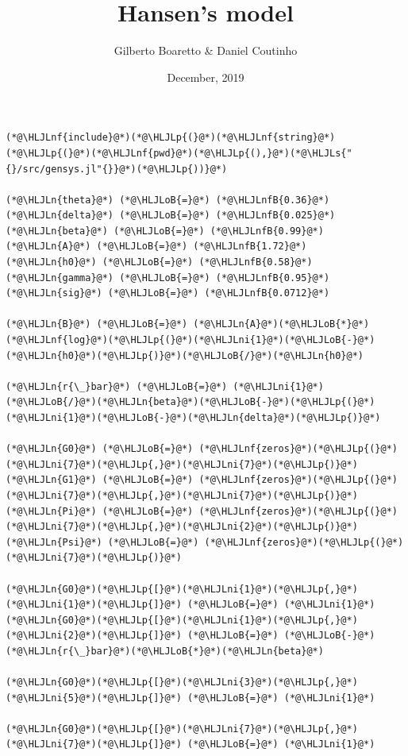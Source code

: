 \documentclass[12pt,a4paper]{article}
\title{ Hansen's model }
\author{ Gilberto Boaretto & Daniel Coutinho }
\date{ December, 2019 }
\newcommand{\HLJLn}[1]{#1}
\newcommand{\HLJLnf}[1]{\textcolor[RGB]{66,102,213}{#1}}
\newcommand{\HLJLs}[1]{\textcolor[RGB]{201,61,57}{#1}}
\newcommand{\HLJLnfB}[1]{\textcolor[RGB]{59,151,46}{#1}}
\newcommand{\HLJLni}[1]{\textcolor[RGB]{59,151,46}{#1}}
\newcommand{\HLJLoB}[1]{\textcolor[RGB]{102,102,102}{\textbf{#1}}}
\newcommand{\HLJLp}[1]{#1}
\begin{document}
\maketitle


\begin{lstlisting}
(*@\HLJLnf{include}@*)(*@\HLJLp{(}@*)(*@\HLJLnf{string}@*)(*@\HLJLp{(}@*)(*@\HLJLnf{pwd}@*)(*@\HLJLp{(),}@*)(*@\HLJLs{"{}/src/gensys.jl"{}}@*)(*@\HLJLp{))}@*)

(*@\HLJLn{theta}@*) (*@\HLJLoB{=}@*) (*@\HLJLnfB{0.36}@*)
(*@\HLJLn{delta}@*) (*@\HLJLoB{=}@*) (*@\HLJLnfB{0.025}@*)
(*@\HLJLn{beta}@*) (*@\HLJLoB{=}@*) (*@\HLJLnfB{0.99}@*)
(*@\HLJLn{A}@*) (*@\HLJLoB{=}@*) (*@\HLJLnfB{1.72}@*)
(*@\HLJLn{h0}@*) (*@\HLJLoB{=}@*) (*@\HLJLnfB{0.58}@*)
(*@\HLJLn{gamma}@*) (*@\HLJLoB{=}@*) (*@\HLJLnfB{0.95}@*)
(*@\HLJLn{sig}@*) (*@\HLJLoB{=}@*) (*@\HLJLnfB{0.0712}@*)

(*@\HLJLn{B}@*) (*@\HLJLoB{=}@*) (*@\HLJLn{A}@*)(*@\HLJLoB{*}@*)(*@\HLJLnf{log}@*)(*@\HLJLp{(}@*)(*@\HLJLni{1}@*)(*@\HLJLoB{-}@*)(*@\HLJLn{h0}@*)(*@\HLJLp{)}@*)(*@\HLJLoB{/}@*)(*@\HLJLn{h0}@*)

(*@\HLJLn{r{\_}bar}@*) (*@\HLJLoB{=}@*) (*@\HLJLni{1}@*)(*@\HLJLoB{/}@*)(*@\HLJLn{beta}@*)(*@\HLJLoB{-}@*)(*@\HLJLp{(}@*)(*@\HLJLni{1}@*)(*@\HLJLoB{-}@*)(*@\HLJLn{delta}@*)(*@\HLJLp{)}@*)

(*@\HLJLn{G0}@*) (*@\HLJLoB{=}@*) (*@\HLJLnf{zeros}@*)(*@\HLJLp{(}@*)(*@\HLJLni{7}@*)(*@\HLJLp{,}@*)(*@\HLJLni{7}@*)(*@\HLJLp{)}@*)
(*@\HLJLn{G1}@*) (*@\HLJLoB{=}@*) (*@\HLJLnf{zeros}@*)(*@\HLJLp{(}@*)(*@\HLJLni{7}@*)(*@\HLJLp{,}@*)(*@\HLJLni{7}@*)(*@\HLJLp{)}@*)
(*@\HLJLn{Pi}@*) (*@\HLJLoB{=}@*) (*@\HLJLnf{zeros}@*)(*@\HLJLp{(}@*)(*@\HLJLni{7}@*)(*@\HLJLp{,}@*)(*@\HLJLni{2}@*)(*@\HLJLp{)}@*)
(*@\HLJLn{Psi}@*) (*@\HLJLoB{=}@*) (*@\HLJLnf{zeros}@*)(*@\HLJLp{(}@*)(*@\HLJLni{7}@*)(*@\HLJLp{)}@*)

(*@\HLJLn{G0}@*)(*@\HLJLp{[}@*)(*@\HLJLni{1}@*)(*@\HLJLp{,}@*)(*@\HLJLni{1}@*)(*@\HLJLp{]}@*) (*@\HLJLoB{=}@*) (*@\HLJLni{1}@*)
(*@\HLJLn{G0}@*)(*@\HLJLp{[}@*)(*@\HLJLni{1}@*)(*@\HLJLp{,}@*)(*@\HLJLni{2}@*)(*@\HLJLp{]}@*) (*@\HLJLoB{=}@*) (*@\HLJLoB{-}@*)(*@\HLJLn{r{\_}bar}@*)(*@\HLJLoB{*}@*)(*@\HLJLn{beta}@*)

(*@\HLJLn{G0}@*)(*@\HLJLp{[}@*)(*@\HLJLni{3}@*)(*@\HLJLp{,}@*)(*@\HLJLni{5}@*)(*@\HLJLp{]}@*) (*@\HLJLoB{=}@*) (*@\HLJLni{1}@*)

(*@\HLJLn{G0}@*)(*@\HLJLp{[}@*)(*@\HLJLni{7}@*)(*@\HLJLp{,}@*)(*@\HLJLni{7}@*)(*@\HLJLp{]}@*) (*@\HLJLoB{=}@*) (*@\HLJLni{1}@*)


\end{lstlisting}
\end{document}
